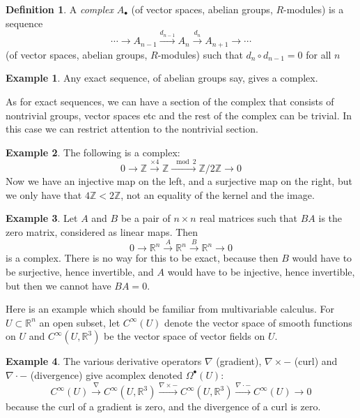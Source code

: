 \documentclass{tufte-handout}
\def\RR{\mathbb{R}}
\def\ZZ{\mathbb{Z}}
\DeclareMathOperator{\im}{im}
\theoremstyle{definition}
\newtheorem{definition}{Definition}
\newtheorem{example}{Example}
\begin{document}
\begin{definition}
A \emph{complex} $A_\bullet$ (of vector spaces, abelian groups, $R$-modules) is a sequence 
\[
	\cdots \to A_{n-1} \xrightarrow{d_{n-1}} A_n \xrightarrow{d_n} A_{n+1} \to \cdots
\]
(of vector spaces, abelian groups, $R$-modules) such that $d_n\circ d_{n-1} = 
0$\marginnote{equivalently, $\im(d_{n-1}) \subseteq \ker(d_n)$} for all $n$
\end{definition}

\begin{example}
Any exact sequence, of abelian groups say, gives a complex.
\end{example}

As for exact sequences, we can have a section of the complex that consists of nontrivial 
groups, vector spaces etc and the rest of the complex can be trivial. In this case 
we can restrict attention to the nontrivial section.

\begin{example}
The following is a complex:
\[
	0\to \ZZ \xrightarrow{\times 4} \ZZ \xrightarrow{\mod{2}} \ZZ/2\ZZ \to 0
\]
Now we have an injective map on the left, and a surjective map on the right, but we only have that $4\ZZ < 2\ZZ$, not an equality of the kernel and the image.
\end{example}


\begin{example}
Let $A$ and $B$ be a pair of $n\times n$ real matrices such that $BA$ is the zero matrix, considered as linear maps. Then
\[
	0\to \RR^n \xrightarrow{A} \RR^n \xrightarrow{B} \RR^n \to 0
\]
is a complex. There is no way for this to be exact, because then $B$ would have to be surjective, hence invertible, and $A$ would have to be injective, hence invertible, but then we cannot have $BA=0$.
\end{example}

Here is an example which should be familiar from multivariable calculus. For $U\subset \RR^n$ an open subset, let $C^\infty(U)$ denote the vector space of smooth functions on $U$ and $C^\infty(U,\RR^3)$ be the vector space of vector fields on $U$.

\begin{example}
The various derivative operators $\nabla$ (gradient), $\nabla\times-$ (curl) and $\nabla\cdot -$ (divergence) give acomplex denoted $\Omega^\bullet(U)$:
\[
	C^\infty(U) \xrightarrow{\nabla} C^\infty(U,\RR^3) \xrightarrow{\nabla\times -} C^\infty(U,\RR^3) \xrightarrow{\nabla\cdot -} C^\infty(U) \to 0
\]
because the curl of a gradient is zero, and the divergence of a curl is zero.
\end{example}
\end{document}

